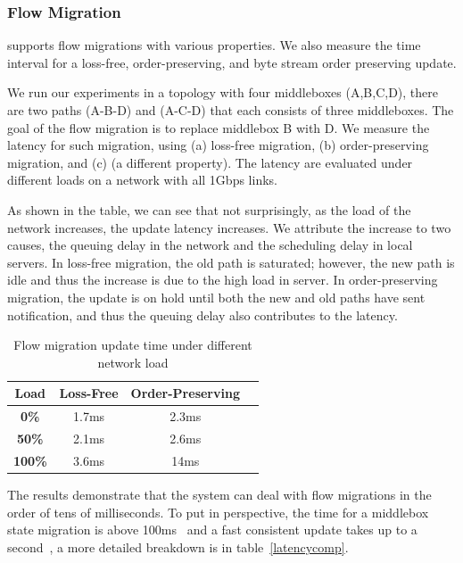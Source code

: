 \subsubsection{Flow Migration}
\system supports flow migrations with various properties. We also measure the time interval for a loss-free, order-preserving, and byte stream order preserving update.   

We run our experiments in a topology with four middleboxes (A,B,C,D), there are two paths (A-B-D) and (A-C-D) that each consists of three middleboxes. The goal of the flow migration is to replace middlebox B with D. We measure the latency for such migration, using (a) loss-free migration, (b) order-preserving migration, and (c) (a different property). The latency are evaluated under different loads on a network with all 1Gbps links. 

As shown in the table, we can see that not surprisingly, as the load of the network increases, the update latency increases. We attribute the increase to two causes, the queuing delay in the network and the scheduling delay in local servers. In loss-free migration, the old path is saturated; however, the new path is idle and thus the increase is due to the high load in server. In order-preserving migration, the update is on hold until both the new and old paths have sent notification, and thus the queuing delay also contributes to the latency. 

\begin{table}[ht]
\centering
\small
\begin{tabular} {|c |c | c| c|}

\hline
Load&Loss-Free& Order-Preserving\\ \hline 

\textbf{0\% }  &1.7ms & 2.3ms \\ \hline
\textbf{50\% }  & 2.1ms &2.6ms \\ \hline
\textbf{100\% }  & 3.6ms &14ms \\ \hline

\end{tabular}
\caption{Flow migration update time under different network load} \label{movelatency} 
\end{table}

The results demonstrate that the system can deal with flow migrations in the order of tens of milliseconds. To put in perspective, the time for a middlebox state migration is above 100ms~\cite{splitmerge, OpenNF} and a fast consistent update takes up to a second~\cite{xinjin}, a more detailed breakdown is in table~\ref{latencycomp}.

